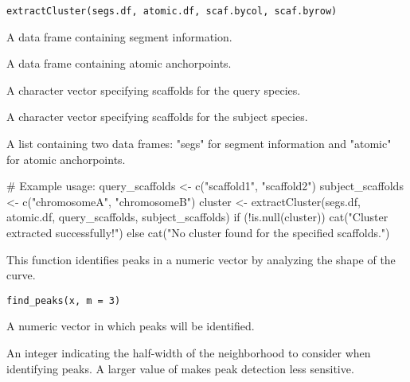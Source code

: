 \documentclass[a4paper]{book}
\begin{document}
%
\begin{Usage}
\begin{verbatim}
extractCluster(segs.df, atomic.df, scaf.bycol, scaf.byrow)
\end{verbatim}
\end{Usage}
%
\begin{Arguments}
\begin{ldescription}
\item[\code{segs.df}] A data frame containing segment information.

\item[\code{atomic.df}] A data frame containing atomic anchorpoints.

\item[\code{scaf.bycol}] A character vector specifying scaffolds for the query species.

\item[\code{scaf.byrow}] A character vector specifying scaffolds for the subject species.
\end{ldescription}
\end{Arguments}
%
\begin{Value}
A list containing two data frames: "segs" for segment information and "atomic" for atomic anchorpoints.
\end{Value}
%
\begin{Examples}
\begin{ExampleCode}
# Example usage:
query_scaffolds <- c("scaffold1", "scaffold2")
subject_scaffolds <- c("chromosomeA", "chromosomeB")
cluster <- extractCluster(segs.df, atomic.df, query_scaffolds, subject_scaffolds)
if (!is.null(cluster)) {
  cat("Cluster extracted successfully!\n")
} else {
  cat("No cluster found for the specified scaffolds.\n")
}
\end{ExampleCode}
\end{Examples}
%
\begin{Description}\relax
This function identifies peaks in a numeric vector by analyzing the shape of the curve.
\end{Description}
%
\begin{Usage}
\begin{verbatim}
find_peaks(x, m = 3)
\end{verbatim}
\end{Usage}
%
\begin{Arguments}
\begin{ldescription}
\item[\code{x}] A numeric vector in which peaks will be identified.

\item[\code{m}] An integer indicating the half-width of the neighborhood to consider when identifying peaks. A larger value of  makes peak detection less sensitive.
\end{ldescription}
\end{Arguments}
\end{document}
